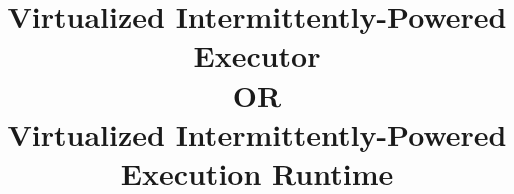 \documentclass[pageno]{jpaper}
\newcommand{\sysfull}{Virtualized Intermittently-Powered Executor\xspace}
\newcommand{\sysfullalt}{Virtualized Intermittently-Powered Execution Runtime\xspace}
\begin{document}
\title{\sysfull \\ OR \\ \sysfullalt}









\date{}
\maketitle

\thispagestyle{empty}

\begin{abstract}

\end{abstract}

\end{document}
